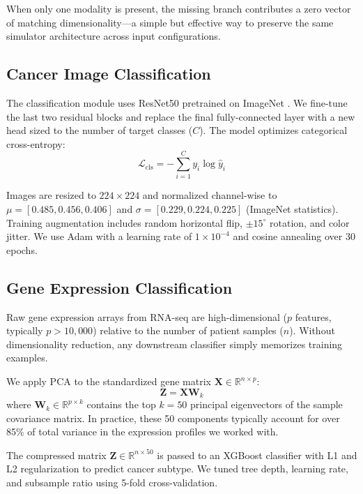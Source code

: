\documentclass[conference]{IEEEtran}
\begin{document}
When only one modality is present, the missing branch contributes a zero vector of matching dimensionality—a simple but effective way to preserve the same simulator architecture across input configurations.

\subsection{Cancer Image Classification}

The classification module uses ResNet50 pretrained on ImageNet \cite{he2016deep}. We fine-tune the last two residual blocks and replace the final fully-connected layer with a new head sized to the number of target classes ($C$). The model optimizes categorical cross-entropy:
\begin{equation}
    \mathcal{L}_{\text{cls}} = -\sum_{i=1}^{C} y_i \log \hat{y}_i
    \label{eq:ce}
\end{equation}

Images are resized to $224 \times 224$ and normalized channel-wise to $\mu = [0.485, 0.456, 0.406]$ and $\sigma = [0.229, 0.224, 0.225]$ (ImageNet statistics). Training augmentation includes random horizontal flip, $\pm 15^{\circ}$ rotation, and color jitter. We use Adam with a learning rate of $1 \times 10^{-4}$ and cosine annealing over 30 epochs.

\subsection{Gene Expression Classification}

Raw gene expression arrays from RNA-seq are high-dimensional ($p$ features, typically $p > 10{,}000$) relative to the number of patient samples ($n$). Without dimensionality reduction, any downstream classifier simply memorizes training examples.

We apply PCA to the standardized gene matrix $\mathbf{X} \in \mathbb{R}^{n \times p}$:
\begin{equation}
    \mathbf{Z} = \mathbf{X} \mathbf{W}_k
    \label{eq:pca}
\end{equation}
where $\mathbf{W}_k \in \mathbb{R}^{p \times k}$ contains the top $k = 50$ principal eigenvectors of the sample covariance matrix. In practice, these 50 components typically account for over 85\% of total variance in the expression profiles we worked with.

The compressed matrix $\mathbf{Z} \in \mathbb{R}^{n \times 50}$ is passed to an XGBoost classifier \cite{chen2016xgboost} with L1 and L2 regularization to predict cancer subtype. We tuned tree depth, learning rate, and subsample ratio using 5-fold cross-validation.
\end{document}
